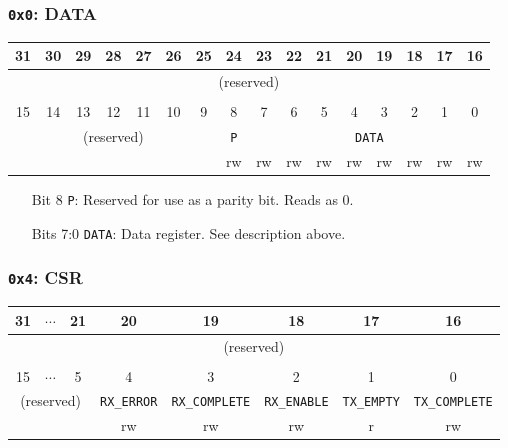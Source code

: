 \documentclass[11pt,openany]{report}
\begin{document}
\subsubsection{\texttt{0x0}: DATA}

\begin{center}
  \begin{tabular}{|c|c|c|c|c|c|c|c|c|c|c|c|c|c|c|c|}
    \hline
    31 & 30 & 29 & 28 & 27 & 26 & 25 & 24 & 23 & 22 & 21 & 20 & 19 & 18 & 17 & 16 \\
    \hline
    \multicolumn{16}{|c|}{\multirow{2}{*}{(reserved)}}\\
    \multicolumn{16}{|c|}{}\\
    \hline
    \multicolumn{16}{c}{}\\
    \hline
    15 & 14 & 13 & 12 & 11 & 10 & 9 & 8 & 7 & 6 & 5 & 4 & 3 & 2 & 1 & 0 \\
    \hline
    \multicolumn{7}{|c|}{\multirow{2}{*}{(reserved)}} & \texttt{P} & \multicolumn{8}{c|}{\texttt{DATA}}\\
    \cline{8-16}
    \multicolumn{7}{|c|}{} & rw & rw & rw & rw & rw & rw & rw & rw & rw\\
    \hline
  \end{tabular}
\end{center}

\begin{enumerate}
\item[Bit 8] \verb|P|: Reserved for use as a parity bit. Reads as 0.
\item[Bits 7:0] \verb|DATA|: Data register. See description above.
\end{enumerate}

\subsubsection{\texttt{0x4}: CSR}
\begin{center}
  \begin{tabular}{|c|c|c|c|c|c|c|c|}
    \hline
    31 & $\cdots$ & 21 & 20 & 19 & 18 & 17 & 16  \\
    \hline
    \multicolumn{8}{|c|}{\multirow{2}{*}{(reserved)}}\\
    \multicolumn{8}{|c|}{}\\
    \hline
    \multicolumn{7}{c}{}\\
    \hline
    15 & $\cdots$ & 5 & 4 & 3 & 2 & 1 & 0 \\
    \hline
    \multicolumn{3}{|c|}{\multirow{2}{*}{(reserved)}} & \texttt{RX\_ERROR} & \texttt{RX\_COMPLETE} & \texttt{RX\_ENABLE} & \texttt{TX\_EMPTY} & \texttt{TX\_COMPLETE} \\
    \cline{4-8}
    \multicolumn{3}{|c|}{} & rw & rw & rw & r & rw\\
    \hline
  \end{tabular}
\end{center}
\end{document}
